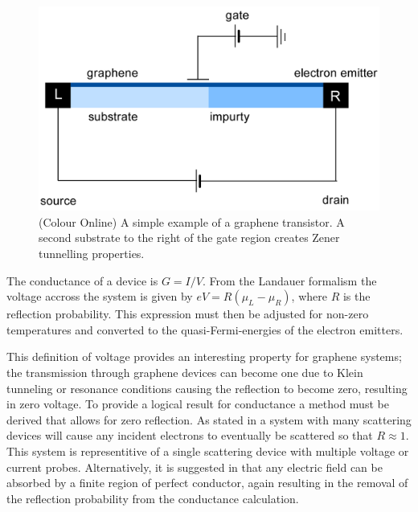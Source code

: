 \documentclass[prl,twocolumn,aps,superscriptaddress,floatfix,10pt]{revtex4}
\begin{document}
\begin{figure}
	\includegraphics[scale=0.2]{transistor-flat}
	\caption{(Colour Online) A simple example of a graphene transistor. A second substrate to the right of the gate region creates Zener tunnelling properties.}
	\label{transistor-flat}
\end{figure}

	The conductance of a device is $G=I/V$. From the Landauer formalism the voltage accross the system is given by $eV=R\left(\mu_{L}-\mu_{R}\right)$, where $R$ is the reflection probability. This expression must then be adjusted for non-zero temperatures and converted to the quasi-Fermi-energies of the electron emitters.

	This definition of voltage provides an interesting property for graphene systems; the transmission through graphene devices can become one due to Klein tunneling or resonance conditions causing the reflection to become zero, resulting in zero voltage. To provide a logical result for conductance a method must be derived that allows for zero reflection. As stated in \cite{b8} a system with many scattering devices will cause any incident electrons to eventually be scattered so that $R \approx 1$. This system is representitive of a single scattering device with multiple voltage or current probes. Alternatively, it is suggested in \cite{b9} that any electric field can be absorbed by a finite region of perfect conductor, again resulting in the removal of the reflection probability from the conductance calculation.
\end{document}
